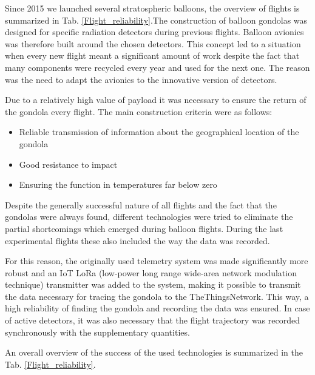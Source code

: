 \documentclass{Rpd}
\begin{document}
Since 2015 we launched several stratospheric balloons, the overview of flights is summarized in Tab. \ref{Flight_reliability}.The construction of balloon gondolas was designed for specific radiation detectors during previous flights. Balloon avionics was therefore built around the chosen detectors.
This concept led to a situation when every new flight meant a significant amount of work despite the fact that many components were recycled every year and used for the next one. The reason was the need to adapt the avionics to the innovative version of detectors.

Due to a relatively high value of payload it was necessary to ensure the return of the gondola every flight. The main construction criteria were as follows:


\begin{itemize}
\item Reliable transmission of information about the geographical location of the gondola
\item Good resistance to impact
\item Ensuring the function in temperatures far below zero
\end{itemize}


Despite the generally successful nature of all flights and the fact that the gondolas were always found, different technologies were tried to eliminate the partial shortcomings which emerged during balloon flights. During the last experimental flights these also included the way the data was recorded.

For this reason, the originally used telemetry system was made significantly more robust and an IoT LoRa (low-power long range wide-area network modulation technique) transmitter was added to the system, making it possible to transmit the data necessary for tracing the gondola to the TheThingsNetwork. This way, a high reliability of finding the gondola and recording the data was ensured. In case of active detectors, it was also necessary that the flight trajectory was recorded synchronously with the supplementary quantities.


An overall overview of the success of the used technologies is summarized in the Tab. \ref{Flight_reliability}.
\end{document}
